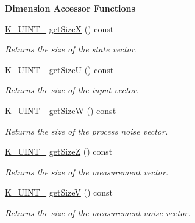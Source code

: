 \begin{Indent}\textbf{ Dimension Accessor Functions}\par
\begin{DoxyCompactItemize}
\item 
\mbox{\label{classKalman_1_1EKFilter_a949674c33d413ba357b5818844ade83a}} 
\mbox{\hyperlink{namespaceKalman_a628a50cae10f6e2035393d4f96c698bd}{K\+\_\+\+U\+I\+N\+T\+\_}} \mbox{\hyperlink{classKalman_1_1EKFilter_a949674c33d413ba357b5818844ade83a}{get\+SizeX}} () const
\begin{DoxyCompactList}\small\item\em Returns the size of the state vector. \end{DoxyCompactList}\item 
\mbox{\label{classKalman_1_1EKFilter_af767738a6535ed55fd5eeaef2be0711f}} 
\mbox{\hyperlink{namespaceKalman_a628a50cae10f6e2035393d4f96c698bd}{K\+\_\+\+U\+I\+N\+T\+\_}} \mbox{\hyperlink{classKalman_1_1EKFilter_af767738a6535ed55fd5eeaef2be0711f}{get\+SizeU}} () const
\begin{DoxyCompactList}\small\item\em Returns the size of the input vector. \end{DoxyCompactList}\item 
\mbox{\label{classKalman_1_1EKFilter_a8274cbce6b66f6d5c636b9d0cf2073d7}} 
\mbox{\hyperlink{namespaceKalman_a628a50cae10f6e2035393d4f96c698bd}{K\+\_\+\+U\+I\+N\+T\+\_}} \mbox{\hyperlink{classKalman_1_1EKFilter_a8274cbce6b66f6d5c636b9d0cf2073d7}{get\+SizeW}} () const
\begin{DoxyCompactList}\small\item\em Returns the size of the process noise vector. \end{DoxyCompactList}\item 
\mbox{\label{classKalman_1_1EKFilter_a3c3353ebb63c6aecdf6ed33827ca51d1}} 
\mbox{\hyperlink{namespaceKalman_a628a50cae10f6e2035393d4f96c698bd}{K\+\_\+\+U\+I\+N\+T\+\_}} \mbox{\hyperlink{classKalman_1_1EKFilter_a3c3353ebb63c6aecdf6ed33827ca51d1}{get\+SizeZ}} () const
\begin{DoxyCompactList}\small\item\em Returns the size of the measurement vector. \end{DoxyCompactList}\item 
\mbox{\label{classKalman_1_1EKFilter_a1b34d010e5de11f2609abef2ffed50e2}} 
\mbox{\hyperlink{namespaceKalman_a628a50cae10f6e2035393d4f96c698bd}{K\+\_\+\+U\+I\+N\+T\+\_}} \mbox{\hyperlink{classKalman_1_1EKFilter_a1b34d010e5de11f2609abef2ffed50e2}{get\+SizeV}} () const
\begin{DoxyCompactList}\small\item\em Returns the size of the measurement noise vector. \end{DoxyCompactList}\end{DoxyCompactItemize}
\end{Indent}

